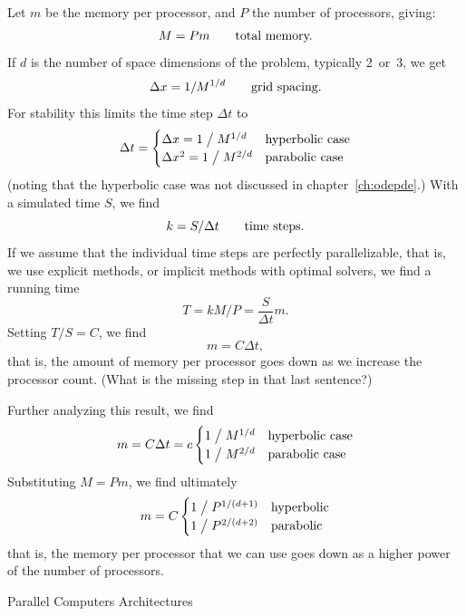 Let $m$ be the memory per processor, and $P$ the number of processors, giving:
\[ M=Pm\qquad\hbox{total memory.} \]
If $d$ is the number of space dimensions of the problem, typically 2~or~3,
we get
\[ \Delta x = 1/M^{1/d}\qquad\hbox{grid spacing.} \]
For stability this limits the time step $\Delta t$ to
\[ \Delta t=
\begin{cases}
\Delta x=1\bigm/M^{1/d}&\hbox{hyperbolic case}\\
\Delta x^2=1\bigm/M^{2/d}&\hbox{parabolic case}
\end{cases}
\]
(noting that the hyperbolic case was not discussed in chapter~\ref{ch:odepde}.)
With a simulated time $S$, we find
\[ k=S/\Delta t\qquad \hbox{time steps.} \]
If we assume that the individual time steps are perfectly parallelizable,
that is, we use explicit methods, or implicit methods with optimal solvers,
we find a running time
\[ T=kM/P=\frac{S}{\Delta t}m. \]
Setting $T/S=C$, we find
\[ m=C\Delta t, \]
that is, the amount of memory per processor goes down as we increase the processor
count. (What is the missing step in that last sentence?)

Further analyzing this result, we find
\[ m=C\Delta t = c
\begin{cases}
1\bigm/M^{1/d}&\hbox{hyperbolic case}\\
1\bigm/M^{2/d}&\hbox{parabolic case}
\end{cases}
\]
Substituting $M=Pm$, we find ultimately
\[ m = C
\begin{cases}
1\bigm/P^{1/(d+1)}&\hbox{hyperbolic}\\
1\bigm/P^{2/(d+2)}&\hbox{parabolic}
\end{cases}
\]
that is, the memory per processor that we can use
goes down as a higher power of the number of processors.


 {Parallel Computers Architectures}

